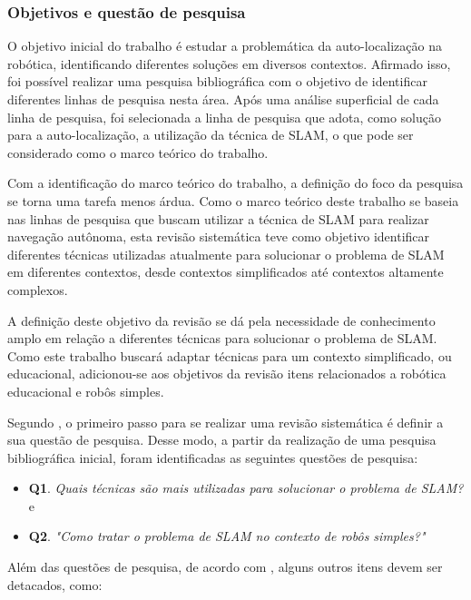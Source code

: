 		\subsubsection{Objetivos e questão de pesquisa}
		
		O objetivo inicial do trabalho é estudar a problemática da auto-localização na robótica, identificando diferentes soluções em diversos contextos. Afirmado isso, foi possível realizar uma pesquisa bibliográfica com o objetivo de identificar diferentes linhas de pesquisa nesta área. Após uma análise superficial de cada linha de pesquisa, foi selecionada a linha de pesquisa que adota, como solução para a auto-localização, a utilização da técnica de SLAM, o que pode ser considerado como o marco teórico do trabalho. 

		Com a identificação do marco teórico do trabalho, a definição do foco da pesquisa se torna uma tarefa menos árdua. Como o marco teórico deste trabalho se baseia nas linhas de pesquisa que buscam utilizar a técnica de SLAM para realizar navegação autônoma, esta revisão sistemática teve como objetivo identificar diferentes técnicas utilizadas atualmente para solucionar o problema de SLAM em diferentes contextos, desde contextos simplificados até contextos altamente complexos.

		A definição deste objetivo da revisão se dá pela necessidade de conhecimento amplo em relação a diferentes técnicas para solucionar o problema de SLAM. Como este trabalho buscará adaptar técnicas para um contexto simplificado, ou educacional, adicionou-se aos objetivos da revisão itens relacionados a robótica educacional e robôs simples.

		Segundo \cite{Kitchenham}, o primeiro passo para se realizar uma revisão sistemática é definir a sua questão de pesquisa. Desse modo, a partir da realização de uma pesquisa bibliográfica inicial, foram identificadas as seguintes questões de pesquisa: 

		\begin{itemize}
			\item \textbf{Q1}. \textit{Quais técnicas são mais utilizadas para solucionar o problema de SLAM?} e
			\item \textbf{Q2}. \textit{"Como tratar o problema de SLAM no contexto de robôs simples?"}
		\end{itemize}

		Além das questões de pesquisa, de acordo com \cite{exemploRevisaoSistematica}, alguns outros itens devem ser detacados, como:

